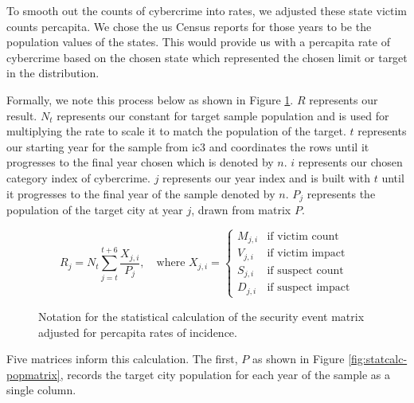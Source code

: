 To smooth out the counts of  \gls{cybercrime} into rates, we adjusted these state victim counts  \gls{percapita}.  We chose the \gls{us} Census reports for those years to be the  \gls{population} values of the states.  This would provide us with a \gls{percapita} rate of  \gls{cybercrime} based on the chosen state which represented the chosen limit or target in the  \gls{distribution}.

Formally, we note this process below as shown in Figure \ref{fig:statcalc-percap}.  $R$ represents our result.  $N_t$ represents our constant for target  \gls{sample}  \gls{population} and is used for multiplying the rate to scale it to match the  \gls{population} of the target. $t$ represents our starting year for the  \gls{sample} from \gls{ic3} and coordinates the rows until it progresses to the final year chosen which is denoted by $n$. $i$ represents our chosen category index of  \gls{cybercrime}. $j$ represents our year index and is built with $t$ until it progresses to the final year of the  \gls{sample} denoted by $n$. $P_j$ represents the  \gls{population} of the target city at year $j$, drawn from  \gls{matrix} $P$.

\begin{figure}[H]
  \centering




\[
R_j = N_t \sum_{j=t}^{t+6} \frac{X_{j,i}}{P_j}, \quad \text{where } X_{j,i} = \begin{cases} M_{j,i} & \text{if victim count} \\ V_{j,i} & \text{if victim impact} \\ S_{j,i} & \text{if suspect count} \\ D_{j,i} & \text{if suspect impact} \end{cases}
\]

  \caption{Notation for the statistical calculation of the security event \gls{matrix} adjusted for \gls{percapita} rates of incidence.}
  \label{fig:statcalc-percap}
\end{figure}

Five matrices inform this calculation.  The first, $P$ as shown in Figure \ref{fig:statcalc-popmatrix}, records the target city  \gls{population} for each year of the  \gls{sample} as a single column.

